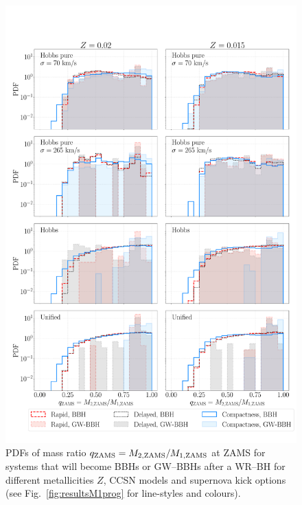 \documentclass[a4paper,titlepage]{book}     	%
\begin{document}
\begin{figure}
	\centering
	\includegraphics[width=\textwidth]{./images/progq.pdf}	
	\caption{PDFs of mass ratio $q_{\rm ZAMS}=M_{\rm 2,ZAMS}/M_{\rm 1,ZAMS}$ at ZAMS for systems that will become BBHs or GW--BBHs after a WR--BH for different metallicities $Z$, CCSN models and supernova kick options (see Fig.\ \ref{fig:resultsM1prog} for line-styles and colours).}\label{fig:resultsqprog}
\end{figure}
\end{document}
